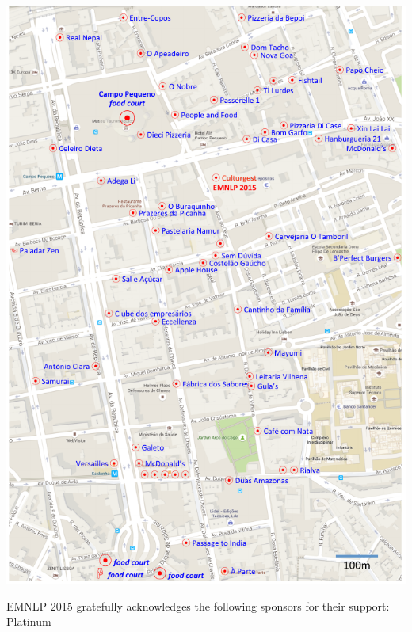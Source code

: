 \noindent \begin{center}
\includegraphics[width=1\columnwidth]{content/images/map-nearby-restaurants}
\par\end{center}

\noindent \thispagestyle{empty}

\noindent EMNLP 2015 gratefully acknowledges the following sponsors
for their support:\\


\noindent Platinum

